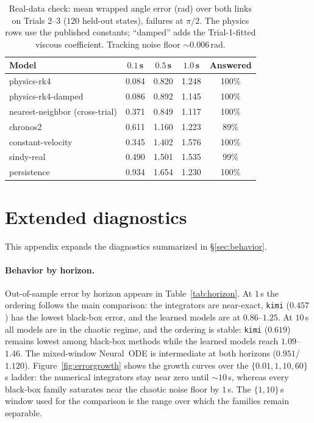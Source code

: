 \documentclass{article}
\begin{document}
\begin{table}[tbp]
\centering\small
\caption{Real-data check: mean wrapped angle error (rad) over both links on Trials 2--3
($120$ held-out states), failures at $\pi/2$. The physics rows use the published constants;
``damped'' adds the Trial-1-fitted viscous coefficient. Tracking noise floor
${\sim}0.006$\,rad.}
\label{tab:realdata}
\begin{tabular}{lcccc}
\toprule
Model & $0.1$\,s & $0.5$\,s & $1.0$\,s & Answered \\
\midrule
physics-rk4 & 0.084 & 0.820 & 1.248 & 100\% \\
physics-rk4-damped & 0.086 & 0.892 & 1.145 & 100\% \\
nearest-neighbor (cross-trial) & 0.371 & 0.849 & 1.117 & 100\% \\
chronos2 & 0.611 & 1.160 & 1.223 & 89\% \\
constant-velocity & 0.345 & 1.402 & 1.576 & 100\% \\
sindy-real & 0.490 & 1.501 & 1.535 & 99\% \\
persistence & 0.934 & 1.654 & 1.230 & 100\% \\
\bottomrule
\end{tabular}
\end{table}

\section{Extended diagnostics}
\label{app:diagnostics}
This appendix expands the diagnostics summarized in \S\ref{sec:behavior}.

\paragraph{Behavior by horizon.}
Out-of-sample error by horizon appears in Table~\ref{tab:horizon}. At $1$\,s the ordering
follows the main comparison: the integrators are near-exact, \texttt{kimi} ($0.457$) has the
lowest black-box error, and the learned models are at $0.86$--$1.25$. At $10$\,s all models
are in the chaotic regime, and the ordering is stable: \texttt{kimi} ($0.619$) remains lowest
among black-box methods while the learned models reach $1.09$--$1.46$. The mixed-window
Neural~ODE is intermediate at both horizons ($0.951$/$1.120$).
Figure~\ref{fig:errorgrowth} shows the growth curves over the
$\{0.01,1,10,60\}$\,s ladder: the numerical integrators stay near zero until ${\sim}10$\,s,
whereas every black-box family saturates near the chaotic noise floor by $1$\,s. The
$\{1,10\}$\,s window used for the comparison is the range over which the families remain
separable.
\end{document}
